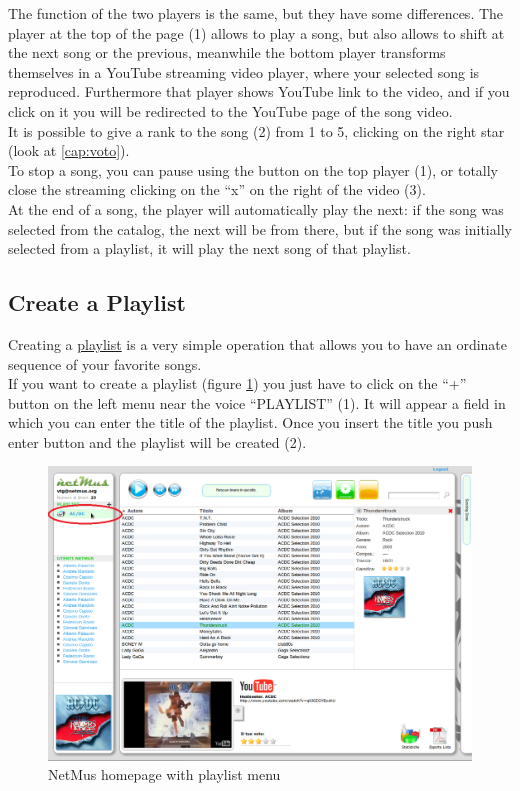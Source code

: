 The function of the two players is the same, but they have some differences.
The player at the top of the page (1) allows to play a song, but also
allows to shift at the next song or the previous, meanwhile the bottom player
transforms themselves in a YouTube streaming video player, where your selected song
is reproduced. Furthermore that player shows YouTube link to the video, and if
you click on it you will be redirected to the YouTube page of the song video.\\
It is possible to give a rank to the song (2) from 1 to 5, clicking on the right
star (look at \ref{cap:voto}).\\

To stop a song, you can pause using the button on the top player (1), or totally
close the streaming clicking on the ``x'' on the right of the video
(3).\\

At the end of a song, the player will automatically play the next: if the song
was selected from the catalog, the next will be from there, but if the song was
initially selected from a playlist, it will play the next song of that
playlist.\\

\subsection{Create a Playlist}

Creating a \underline{playlist} is a very simple operation that allows you to
have an ordinate sequence of your favorite songs.\\
If you want to create a playlist (figure \ref{fig:playlist}) you just have to
click on the ``+'' button on the left menu near the voice ``PLAYLIST'' (1). It
will appear a field in which you can enter the title of the playlist. Once you insert the title you push
enter button and the playlist will be created (2).\\

\begin{figure}[!htbp]
  \centering
  \includegraphics[width=15cm]{img/MU/new_playlist.png}
\caption{NetMus homepage with playlist menu}
\label{fig:playlist}
\end{figure}

